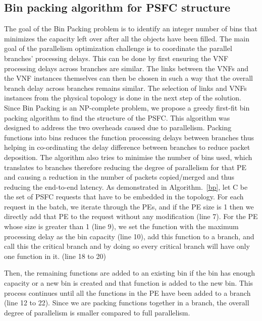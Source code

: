 \documentclass[journal]{IEEEtran}
\begin{document}
\subsection{Bin packing algorithm for PSFC structure}
The goal of the Bin Packing problem is to identify an integer number of bins that minimizes the capacity left over after all the objects have been filled. The main goal of the parallelism optimization challenge is to coordinate the parallel branches' processing delays. This can be done by first ensuring the VNF processing delays across branches are similar. The links between the VNFs and the VNF instances themselves can then be chosen in such a way that the overall branch delay across branches remains similar. The selection of links and VNFs instances from the physical topology is done in the next step of the solution. Since Bin Packing is an NP-complete problem, we propose a greedy first-fit bin packing algorithm to find the structure of the PSFC. This algorithm was designed to address the two overheads caused due to parallelism. Packing functions into bins reduces the function processing delays between branches thus helping in co-ordinating the delay difference between branches to reduce packet deposition. The algorithm also tries to minimise the number of bins used, which translates to branches therefore reducing the degree of parallelism for that PE and causing a reduction in the number of packets copied/merged and thus reducing the end-to-end latency. As demonstrated in Algorithm.~\ref{bp}, let C be the set of PSFC requests that have to be embedded in the topology. For each request in the batch, we iterate through the PEs, and if the PE size is 1 then we directly add that PE to the request without any modification (line 7). For the PE whose size is greater than 1 (line 9), we set the function with the maximum processing delay as the bin capacity (line 10), add this function to a branch, and call this the critical branch and by doing so every critical branch will have only one function in it. (line 18 to 20)


Then, the remaining functions are added to an existing bin if the bin has enough capacity or a new bin is created and that function is added to the new bin. This process continues until all the functions in the PE have been added to a branch (line 12 to 22). Since we are packing functions together in a branch, the overall degree of parallelism is smaller compared to full parallelism.
\end{document}
